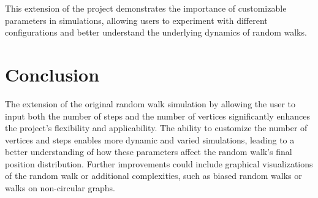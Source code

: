 \documentclass[a4paper,12pt]{amsart}
\begin{document}
This extension of the project demonstrates the importance of customizable parameters in simulations, allowing users to experiment with different configurations and better understand the underlying dynamics of random walks.

\section{Conclusion}
The extension of the original random walk simulation by allowing the user to input both the number of steps and the number of vertices significantly enhances the project’s flexibility and applicability. The ability to customize the number of vertices and steps enables more dynamic and varied simulations, leading to a better understanding of how these parameters affect the random walk’s final position distribution. Further improvements could include graphical visualizations of the random walk or additional complexities, such as biased random walks or walks on non-circular graphs.
\end{document}
